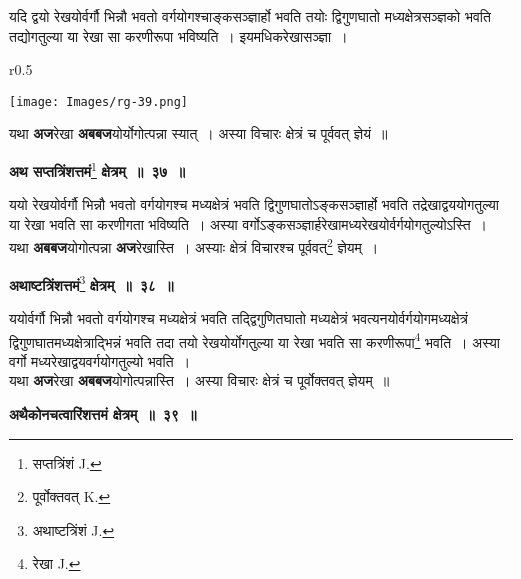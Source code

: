 \documentclass[11pt, openany]{book}
\begin{document}
{\ab यदि द्वयो रेखयोर्वर्गौ भिन्नौ भवतो वर्गयोगश्चाङ्कसञ्ज्ञार्हो भवति तयोः द्विगुणघातो मध्यक्षेत्रसञ्ज्ञको भवति तद्योगतुल्या या रेखा सा करणीरूपा भविष्यति~। इयमधिकरेखासञ्ज्ञा~। }\\

\begin{wrapfigure}{r}{0.5\textwidth}
\vspace{-8mm}
\begin{center}
\texttt{[image: Images/rg-39.png]}
\end{center}
\vspace{-8mm}
\end{wrapfigure}

यथा \textbf{अज}रेखा \textbf{अबबज}योर्योगोत्पन्ना स्यात्~। अस्या विचारः क्षेत्रं च पूर्ववत् ज्ञेयं~॥ 

\newpage
\begin{center} 
\textbf{\large अथ सप्तत्रिंशत्तमं}\renewcommand{\thefootnote}{१}\footnote{सप्तत्रिंशं {\en J.}} \textbf{\large क्षेत्रम्~॥~३७~॥}
\end{center}

{\ab  ययो रेखयोर्वर्गौ भिन्नौ भवतो वर्गयोगश्च मध्यक्षेत्रं भवति द्विगुणघातोऽङ्कसञ्ज्ञार्हो भवति तद्रेखाद्वययोगतुल्या या रेखा भवति सा करणीगता भविष्यति~। अस्या वर्गोऽङ्कसञ्ज्ञार्हरेखामध्यरेखयोर्वर्गयोगतुल्योऽस्ति~। }\\

 यथा \textbf{अबबज}योगोत्पन्ना \textbf{अज}रेखास्ति~। अस्याः क्षेत्रं विचारश्च पूर्ववत्\renewcommand{\thefootnote}{२}\footnote{पूर्वोक्तवत् {\en K.}} ज्ञेयम्~। 
\vspace{2mm}
 
\begin{center}
\textbf{\large अथाष्टत्रिंशत्तमं}\renewcommand{\thefootnote}{3}\footnote{अथाष्टत्रिंशं {\en J.}} \textbf{\large क्षेत्रम्~॥~३८~॥}
\end{center}

{\ab  ययोर्वर्गौ भिन्नौ भवतो वर्गयोगश्च मध्यक्षेत्रं भवति तद्द्विगुणितघातो मध्यक्षेत्रं भवत्यनयोर्वर्गयोगमध्यक्षेत्रं द्विगुणघातमध्यक्षेत्राद्भिन्नं भवति तदा तयो रेखयोर्योगतुल्या या रेखा भवति सा करणीरूपा\renewcommand{\thefootnote}{४}\footnote{रेखा {\en J.}} भवति~। अस्या वर्गो मध्यरेखाद्वयवर्गयोगतुल्यो भवति~। }\\

 यथा \textbf{अज}रेखा \textbf{अबबज}योगोत्पन्नास्ति~। अस्या विचारः क्षेत्रं च पूर्वोक्तवत् ज्ञेयम्~॥ 
\vspace{-2mm}

\begin{center}
\textbf{\large अथैकोनचत्वारिंशत्तमं क्षेत्रम्~॥~३९~॥}
\end{center}
\end{document}
